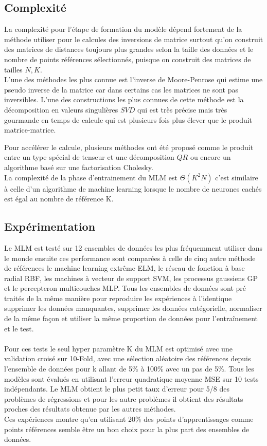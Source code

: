 \documentclass[12pt,a4paper]{report}
\begin{document}
\subsection{Complexité}
\par La complexité pour l'étape de formation du modèle  dépend fortement de la méthode utiliser pour le calcules des inversions de matrice surtout qu'on construit des matrices de distances toujours plus grandes selon la taille des données et le nombre de points références sélectionnés, puisque on construit des matrices de tailles $N,K$.\\
L'une des méthodes les plus connue est l'inverse de Moore-Penrose qui estime une pseudo inverse de la matrice car dans certains cas les matrices ne sont pas inversibles. L'une des constructions les plus connues de cette méthode est la décomposition en valeurs singulières $SVD$ qui est très précise mais très gourmande en temps de calcule qui est plusieurs fois plus élever que le produit matrice-matrice.\\
\par Pour accélérer le calcule, plusieurs méthodes ont été proposé comme le produit entre un type spécial de tenseur et une décomposition $QR$ ou encore un algorithme basé sur une factorisation Cholesky.\\
La complexité de la phase d'entrainement du MLM est $\Theta (K^2N)$ c'est similaire à celle d'un algorithme de machine learning lorsque le nombre de neurones cachés est égal au nombre de référence K.
\subsection{Expérimentation}
\par Le MLM est testé sur 12 ensembles de données les plus fréquemment utiliser dans le monde ensuite ces performance sont comparées à celle de cinq autre  méthode de références le machine learning extrême ELM, le réseau de fonction à base radial RBF, les machines à vecteur de support SVM, les processus gaussiens GP et le percepteron multicouches MLP. Tous les ensembles de données sont pré traités de la même manière pour reproduire les expériences à l'identique supprimer les données manquantes, supprimer les données catégorielle, normaliser de la même façon et utiliser la même proportion de données pour l'entraînement et le test. \\ \\
Pour ces tests le seul hyper paramètre K du MLM est optimisé avec une validation croisé sur 10-Fold, avec une sélection aléatoire des références depuis l'ensemble de données pour k allant de 5\% à 100\% avec un pas de 5\%. Tous les modèles sont évalués en utilisant l'erreur quadratique moyenne MSE sur 10 tests indépendants. Le MLM obtient le plus petit taux d'erreur pour 5/8 des problèmes de régressions et pour les autre problèmes il obtient des résultats proches des résultats obtenue par les autres méthodes.\\
Ces expériences montre qu'en utilisant 20\% des points d'apprentissages comme points références semble être un bon choix pour la plus part des ensembles de données.
\end{document}
